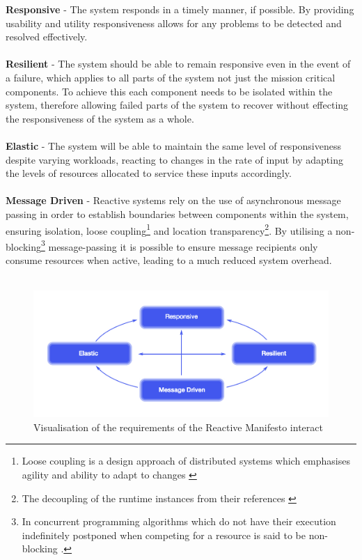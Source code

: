 \documentclass[a4paper, 11pt]{article}
\begin{document}
\textbf{Responsive} - The system responds in a timely manner, if possible. By providing usability and utility responsiveness allows for any problems to be detected and resolved effectively.\\\\
\textbf{Resilient} - The system should be able to remain responsive even in the event of a failure, which applies to all parts of the system not just the mission critical components. To achieve this each component needs to be isolated within the system, therefore allowing failed parts of the system to recover without effecting the responsiveness of the system as a whole.\\\\
\textbf{Elastic} - The system will be able to maintain the same level of responsiveness despite varying workloads, reacting to changes in the rate of input by adapting the levels of resources allocated to service these inputs accordingly.\\\\
\textbf{Message Driven} - Reactive systems rely on the use of asynchronous message passing in order to establish boundaries between components within the system, ensuring isolation, loose coupling\footnote{Loose coupling is a design approach of distributed systems which emphasises agility and ability to adapt to changes \cite{looseCouple}} and location transparency\footnote{The decoupling of the runtime instances from their references \cite{reactMan}}. By utilising a non-blocking\footnote{In concurrent programming algorithms which do not have their execution indefinitely postponed when competing for a resource is said to be non-blocking \cite{reactMan}.} message-passing it is possible to ensure message recipients only consume resources when active, leading to a much reduced system overhead.\\\\

\begin{figure}[ht]
	\centering
	\includegraphics[scale=0.25]{images/reacManif.jpg}
	\caption{Visualisation of the requirements of the Reactive Manifesto interact \cite{reactMan}}
	\label{fig: reacMan}
\end{figure}
\end{document}
